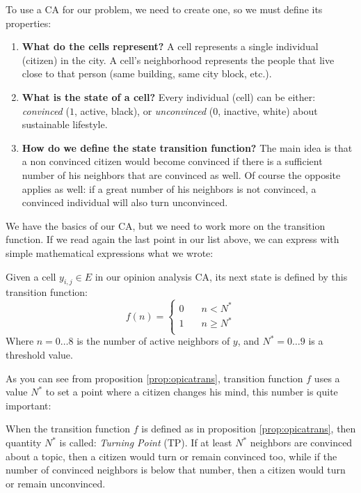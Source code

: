 To use a CA for our problem, we need to create one, so we must define its properties:

\begin{enumerate}
\item \textbf{What do the cells represent?} A cell represents a single individual (citizen) in the city.
A cell's neighborhood represents the people that live close to that person
(same building, same city block, etc.).
\item \textbf{What is the state of a cell?} Every individual (cell) can be either: \textit{convinced}
($1$, active, black), or \textit{unconvinced} ($0$, inactive, white) about sustainable lifestyle.
\item \textbf{How do we define the state transition function?} The main idea is that a non convinced citizen
would become convinced if there is a sufficient number of his neighbors that are convinced as well.
Of course the opposite applies as well: if a great number of his neighbors is not convinced,
a convinced individual will also turn unconvinced.
\end{enumerate}

We have the basics of our CA, but we need to work more on the transition function. If we read again the
last point in our list above, we can express with simple mathematical expressions what we wrote:

\begin{proposition}
\label{prop:opicatrans}
Given a cell $y_{i,j} \in E$ in our opinion analysis CA, its next state is defined by this
transition function:
\begin{equation}
f(n) =
  \begin{cases}
    0       & \quad n < N^\ast\\
    1       & \quad n \geq N^\ast\\
  \end{cases}
\end{equation}
Where $n = 0 \dots 8$ is the number of active neighbors of $y$, and $N^\ast = 0 \dots 9$ is a threshold
value.
\end{proposition}

As you can see from proposition \ref{prop:opicatrans}, transition function $f$ uses a value $N^\ast$ to
set a point where a citizen changes his mind, this number is quite important:

\begin{definition}
\label{def:tp}
When the transition function $f$ is defined as in proposition \ref{prop:opicatrans}, then quantity
$N^\ast$ is called: \textit{Turning Point} (TP).
If at least $N^\ast$ neighbors are convinced about
a topic, then a citizen would turn or remain convinced too, while if the number of convinced neighbors
is below that number, then a citizen would turn or remain unconvinced.
\end{definition}

